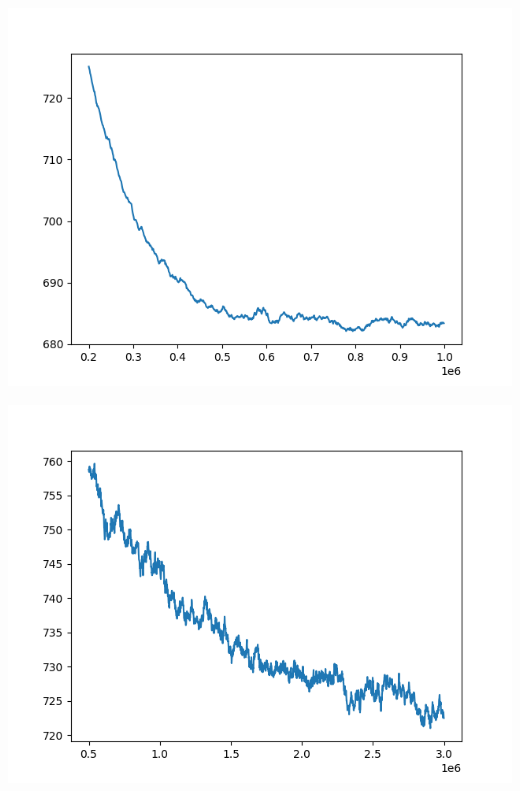 \documentclass{article}
\begin{document}
\begin{enumerate}[label=\arabic*.]
\begin{minipage}{0.49\linewidth}
            \includegraphics[width=\linewidth]{../starter_code/figs/sgd_wo_k_60.png}
            \label{nobiasreg60}
        \end{minipage}\hfill
        \begin{minipage}{0.49\linewidth}
            \includegraphics[width=\linewidth]{../starter_code/figs/sgd_k60.png}
            \label{withbiasreg60}
        \end{minipage}\hfill
        \begin{minipage}{0.49\linewidth}

\end{minipage}
\end{enumerate}
\end{document}
